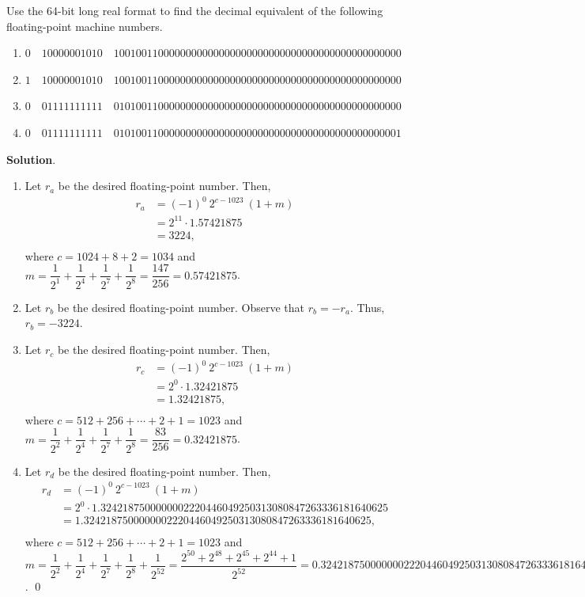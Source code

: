 \documentclass[11pt]{article}
\theoremstyle{break}
\numberwithin{equation}{theorem}
\begin{document}
\newpage
\begin{problem}\label{problem 7}
    Use the 64-bit long real format to find the decimal equivalent of the following floating-point machine numbers.
    \begin{enumerate}
        \item $0\quad 10000001010\quad 1001001100000000000000000000000000000000000000000000$
        \item $1\quad 10000001010\quad 1001001100000000000000000000000000000000000000000000$
        \item $0\quad 01111111111\quad 0101001100000000000000000000000000000000000000000000$
        \item $0\quad 01111111111\quad 0101001100000000000000000000000000000000000000000001$
    \end{enumerate}
\end{problem}
\textbf{Solution}.
\begin{enumerate}
    \item Let $r_a$ be the desired floating-point number. Then, \vspace{-0.6em}
    \begin{align*}
        r_a&=(-1)^0\:2^{c-1023}\:(1+m)\\
        &=2^{11}\cdot1.57421875\\
        &=3224,\\[-3.4em]
    \end{align*}
    where $c=1024+8+2=1034$ and $m=\dfrac{1}{2^{1}}+\dfrac{1}{2^{4}}+\dfrac{1}{2^{7}}+\dfrac{1}{2^{8}}=\dfrac{147}{256}=0.57421875$.
    \item Let $r_b$ be the desired floating-point number. Observe that $r_b=-r_a$. Thus, $r_b=-3224$.
    \item Let $r_c$ be the desired floating-point number. Then, \vspace{-0.6em}
    \begin{align*}
        r_c&=(-1)^0\:2^{c-1023}\:(1+m)\\
        &=2^{0}\cdot1.32421875\\
        &=1.32421875,\\[-3.4em]
    \end{align*}
    where $c=512+256+\cdots+2+1=1023$ and $m=\dfrac{1}{2^{2}}+\dfrac{1}{2^{4}}+\dfrac{1}{2^{7}}+\dfrac{1}{2^{8}}=\dfrac{83}{256}=0.32421875$.
    \item Let $r_d$ be the desired floating-point number. Then, \vspace{-0.6em}
    \begin{align*}
        r_d&=(-1)^0\:2^{c-1023}\:(1+m)\\
        &=2^{0}\cdot1.3242187500000002220446049250313080847263336181640625\\
        &=1.3242187500000002220446049250313080847263336181640625,\\[-3.4em]
    \end{align*}
    where $c=512+256+\cdots+2+1=1023$ and $m=\dfrac{1}{2^{2}}+\dfrac{1}{2^{4}}+\dfrac{1}{2^{7}}+\dfrac{1}{2^{8}}+\dfrac{1}{2^{52}}=\dfrac{2^{50}+2^{48}+2^{45}+2^{44}+1}{2^{52}}=0.3242187500000002220446049250313080847263336181640625$. \qed
\end{enumerate}
\end{document}
